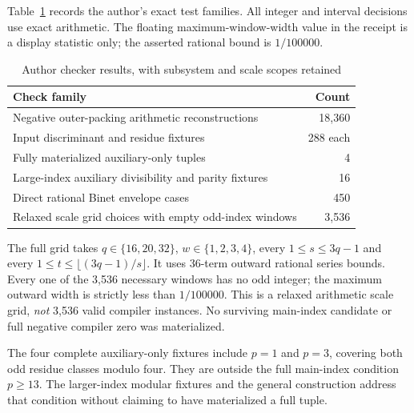 \documentclass[11pt,letterpaper]{article}
\theoremstyle{definition}\newtheorem{definition}[theorem]{Definition}
\theoremstyle{remark}\newtheorem{remark}[theorem]{Remark}
\begin{document}
Table~\ref{fup:nz:tab:checks} records the author's exact test families. All integer and interval decisions use exact arithmetic. The floating maximum-window-width value in the receipt is a display statistic only; the asserted rational bound is $1/100000$.
\begin{table}[!ht]\centering\small
\begin{tabular}{@{}p{}r@{}}
\toprule Check family & Count\\\midrule
Negative outer-packing arithmetic reconstructions & 18,360\\
Input discriminant and residue fixtures & 288 each\\
Fully materialized auxiliary-only tuples & 4\\
Large-index auxiliary divisibility and parity fixtures & 16\\
Direct rational Binet envelope cases & 450\\
Relaxed scale grid choices with empty odd-index windows & 3,536\\
\bottomrule
\end{tabular}
\caption{Author checker results, with subsystem and scale scopes retained}\label{fup:nz:tab:checks}
\end{table}
The full grid takes $q\in\{16,20,32\}$, $w\in\{1,2,3,4\}$, every $1\le s\le3q-1$ and every $1\le t\le\lfloor(3q-1)/s\rfloor$. It uses 36-term outward rational series bounds. Every one of the 3,536 necessary windows has no odd integer; the maximum outward width is strictly less than $1/100000$. This is a relaxed arithmetic scale grid, \emph{not} 3,536 valid compiler instances. No surviving main-index candidate or full negative compiler zero was materialized.

The four complete auxiliary-only fixtures include $p=1$ and $p=3$, covering both odd residue classes modulo four. They are outside the full main-index condition $p\ge13$. The larger-index modular fixtures and the general construction address that condition without claiming to have materialized a full tuple.
\end{document}
